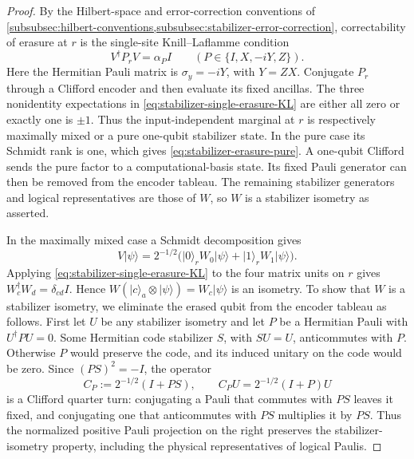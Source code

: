 \documentclass[11pt,letterpaper,onecolumn]{article}
\theoremstyle{plain}
\theoremstyle{definition}
\theoremstyle{remark}
\begin{document}
\begin{proof}
By the Hilbert-space and error-correction conventions of
\cref{subsubsec:hilbert-conventions,subsubsec:stabilizer-error-correction},
correctability of erasure
at \(r\) is the single-site Knill--Laflamme condition
\begin{equation}
 V^\dagger P_rV=\alpha_P I
 \qquad(P\in\{I,X,-iY,Z\}).
 \label{eq:stabilizer-single-erasure-KL}
\end{equation}
Here the Hermitian Pauli matrix is \(\sigma_y=-iY\), with \(Y=ZX\).
Conjugate \(P_r\) through a Clifford encoder and then evaluate its fixed
ancillas.  The three nonidentity expectations in
\cref{eq:stabilizer-single-erasure-KL} are either all zero or exactly one is
\(\pm1\).  Thus the input-independent marginal at \(r\) is respectively
maximally mixed or a pure one-qubit stabilizer state.  In the pure case its
Schmidt rank is one, which gives \cref{eq:stabilizer-erasure-pure}.
A one-qubit Clifford sends the pure factor to a computational-basis state.
Its fixed Pauli generator can then be removed from the encoder tableau.
The remaining stabilizer generators and logical representatives are those
of \(W\), so \(W\) is a stabilizer isometry as asserted.

In the maximally mixed case a Schmidt decomposition gives
\[
 V\lvert\psi\rangle
 =2^{-1/2}\bigl(\lvert0\rangle_rW_0\lvert\psi\rangle
                 +\lvert1\rangle_rW_1\lvert\psi\rangle\bigr).
\]
Applying \cref{eq:stabilizer-single-erasure-KL} to the four matrix units on
\(r\) gives \(W_c^\dagger W_d=\delta_{cd}I\).  Hence
\(
 W(\lvert c\rangle_a\otimes\lvert\psi\rangle)=W_c\lvert\psi\rangle
\)
is an isometry.  To show that \(W\) is a stabilizer isometry, we eliminate the erased
qubit from the encoder tableau as follows.
First let \(U\) be any stabilizer isometry and let \(P\) be a Hermitian
Pauli with \(U^\dagger PU=0\).  Some Hermitian code stabilizer \(S\),
with \(SU=U\), anticommutes with \(P\).  Otherwise \(P\) would preserve
the code, and its induced unitary on the code would be zero.  Since
\((PS)^2=-I\), the operator
\[
 C_P:=2^{-1/2}(I+PS),\qquad
 C_PU=2^{-1/2}(I+P)U
\]
is a Clifford quarter turn: conjugating a Pauli that commutes with \(PS\)
leaves it fixed, and conjugating one that anticommutes with \(PS\)
multiplies it by \(PS\).  Thus the normalized positive Pauli projection
on the right preserves the stabilizer-isometry property, including the
physical representatives of logical Paulis.


\end{proof}
\end{document}
